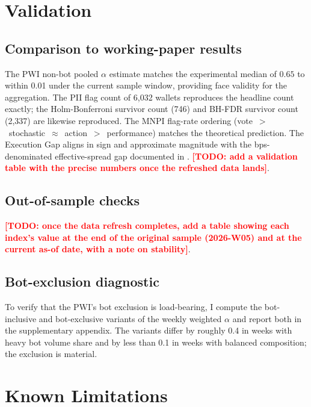 \documentclass[11pt,letterpaper]{article}
\newcommand{\TODO}[1]{\textcolor{red}{\textbf{[TODO: #1]}}}
\begin{document}
\section{Validation}
\label{sec:validation}

\subsection{Comparison to working-paper results}

The PWI non-bot pooled $\alpha$ estimate matches the \citet{tverskykahneman1992} experimental median of $0.65$ to within 0.01 under the current sample window, providing face validity for the aggregation. The PII flag count of 6{,}032 wallets reproduces the \citet{dellavedova2026orthogonality} headline count exactly; the Holm-Bonferroni survivor count (746) and BH-FDR survivor count (2{,}337) are likewise reproduced. The MNPI flag-rate ordering (vote~$>$~stochastic~$\approx$~action~$>$~performance) matches the theoretical prediction. The Execution Gap aligns in sign and approximate magnitude with the bps-denominated effective-spread gap documented in \citet{dellavedova2026profits}. \TODO{add a validation table with the precise numbers once the refreshed data lands}.

\subsection{Out-of-sample checks}

\TODO{once the data refresh completes, add a table showing each index's value at the end of the original sample (2026-W05) and at the current as-of date, with a note on stability}.

\subsection{Bot-exclusion diagnostic}

To verify that the PWI's bot exclusion is load-bearing, I compute the bot-inclusive and bot-exclusive variants of the weekly weighted $\alpha$ and report both in the supplementary appendix. The variants differ by roughly 0.4 in weeks with heavy bot volume share and by less than 0.1 in weeks with balanced composition; the exclusion is material.

\section{Known Limitations}
\label{sec:limits}
\end{document}
